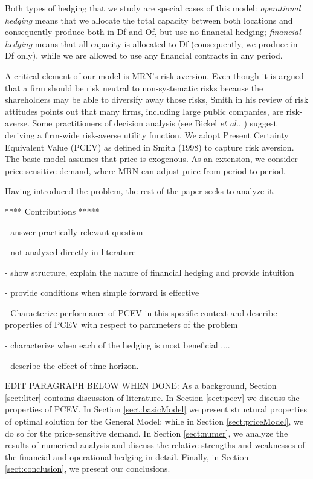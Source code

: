 \documentclass[mnsc,nonblindrev,copyedit]{informs2_wz} %
\begin{document}
Both types of hedging that we study are special cases of this model:  {\em operational hedging} means that we allocate the total capacity between both locations and consequently produce both in Df and Of, but use no financial hedging; {\em financial hedging} means that all capacity is allocated to Df (consequently, we produce in Df only), while we are allowed to use any financial contracts in any period.  

A critical element of our model is MRN's risk-aversion. Even though it is argued that a firm should be risk neutral to non-systematic risks because the shareholders may be able to diversify away those risks, Smith \cite{Smith2004} in his review of risk attitudes points out that many firms, including large public companies, are risk-averse.  Some practitioners of decision analysis (see Bickel {\it et al.}.  \cite{Bickel2002}) suggest deriving a firm-wide risk-averse utility function.  We adopt Present Certainty Equivalent Value (PCEV) as defined in Smith (1998) to capture risk aversion.  The basic model assumes that price is exogenous.  As an extension, we consider price-sensitive demand, where MRN can adjust price from period to period.


Having introduced the problem, the rest of the paper seeks to analyze it.  


**** Contributions *****

- answer practically relevant question

- not analyzed directly in literature

- show structure, explain the nature of financial hedging and provide intuition

- provide conditions when simple forward is effective

- Characterize performance of PCEV in this specific context and describe properties of PCEV with respect to parameters of the problem

- characterize when each of the hedging is most beneficial ....

- describe the effect of time horizon.

EDIT PARAGRAPH BELOW WHEN DONE:
As a background, Section \ref{sect:liter} contains discussion of literature. In Section \ref{sect:pcev} we discuss the properties of PCEV. In Section \ref{sect:basicModel} we present structural properties of optimal solution for the General Model; while in Section \ref{sect:priceModel}, we do so for the price-sensitive demand.  In Section \ref{sect:numer}, we analyze the results of numerical analysis and discuss the relative strengths and weaknesses of the financial and operational hedging in detail.  Finally, in Section \ref{sect:conclusion}, we present our conclusions.
\end{document}
